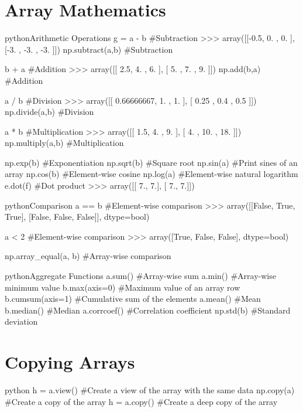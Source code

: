 \section{Array Mathematics}

\begin{codebox}{python}{Arithmetic Operations}
g = a - b  #Subtraction
>>> array([[-0.5, 0. , 0. ], [-3. , -3. , -3. ]])
np.subtract(a,b)  #Subtraction

b + a  #Addition
>>> array([[ 2.5, 4. , 6. ], [ 5. , 7. , 9. ]])
np.add(b,a)  #Addition

a / b  #Division
>>> array([[ 0.66666667, 1. , 1. ], [ 0.25 , 0.4 , 0.5 ]])
np.divide(a,b)  #Division

a * b  #Multiplication
>>> array([[ 1.5, 4. , 9. ], [ 4. , 10. , 18. ]])
np.multiply(a,b)  #Multiplication

np.exp(b)  #Exponentiation
np.sqrt(b)  #Square root
np.sin(a)  #Print sines of an array
np.cos(b)  #Element-wise cosine
np.log(a)  #Element-wise natural logarithm
e.dot(f)  #Dot product
>>> array([[ 7., 7.], [ 7., 7.]])
\end{codebox}

\begin{codebox}{python}{Comparison}
a == b  #Element-wise comparison
>>> array([[False, True, True], [False, False, False]], dtype=bool)

a < 2  #Element-wise comparison
>>> array([True, False, False], dtype=bool)

np.array_equal(a, b)  #Array-wise comparison
\end{codebox}

\begin{codebox}{python}{Aggregate Functions}
a.sum()  #Array-wise sum
a.min()  #Array-wise minimum value
b.max(axis=0)  #Maximum value of an array row
b.cumsum(axis=1)  #Cumulative sum of the elements
a.mean()  #Mean
b.median()  #Median
a.corrcoef()  #Correlation coefficient
np.std(b)  #Standard deviation
\end{codebox}


\section{Copying Arrays}

\begin{codebox}{python}{}
h = a.view()  #Create a view of the array with the same data
np.copy(a)  #Create a copy of the array
h = a.copy()  #Create a deep copy of the array
\end{codebox}


